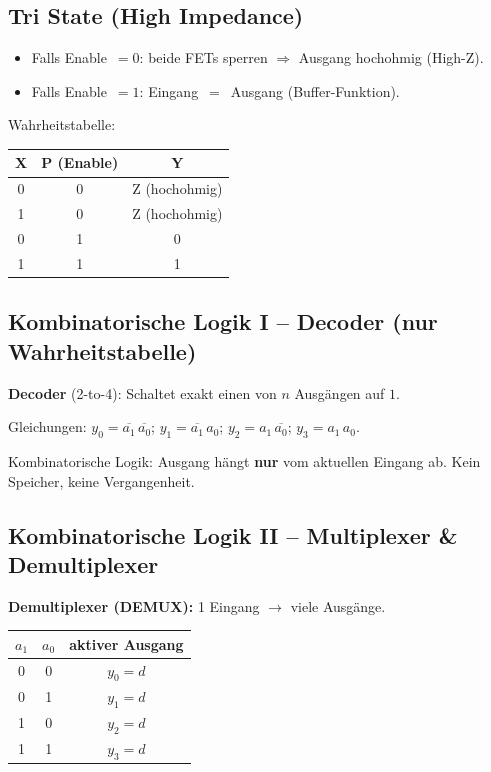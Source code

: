 \documentclass[11pt,a4paper]{article}
\begin{document}
\subsection{Tri State (High Impedance)}
\begin{itemize}
    \item Falls Enable~$= 0$: beide FETs sperren $\Rightarrow$ Ausgang hochohmig (High-Z).
    \item Falls Enable~$= 1$: Eingang~$=$~Ausgang (Buffer-Funktion).
\end{itemize}
Wahrheitstabelle:
\begin{center}
\begin{tabular}{cc|c}
    \toprule
    X & P (Enable) & Y \\ \midrule
    0 & 0 & Z (hochohmig) \\
    1 & 0 & Z (hochohmig) \\
    0 & 1 & 0 \\
    1 & 1 & 1 \\ \bottomrule
\end{tabular}
\end{center}

\subsection{Kombinatorische Logik I -- Decoder (nur Wahrheitstabelle)}
\textbf{Decoder} (2-to-4): Schaltet exakt einen von $n$ Ausgängen auf $1$.

Gleichungen: $y_0 = \overline{a_1}\,\overline{a_0}$; $y_1 = \overline{a_1}\,a_0$; $y_2 = a_1\,\overline{a_0}$; $y_3 = a_1\,a_0$.

Kombinatorische Logik: Ausgang hängt \textbf{nur} vom aktuellen Eingang ab. Kein Speicher, keine Vergangenheit.

\subsection{Kombinatorische Logik II -- Multiplexer \& Demultiplexer}
\textbf{Demultiplexer (DEMUX):} 1 Eingang $\to$ viele Ausgänge.

\begin{center}
\begin{tabular}{cc|c}
    \toprule
    $a_1$ & $a_0$ & aktiver Ausgang \\ \midrule
    0 & 0 & $y_0 = d$ \\
    0 & 1 & $y_1 = d$ \\
    1 & 0 & $y_2 = d$ \\
    1 & 1 & $y_3 = d$ \\ \bottomrule
\end{tabular}
\end{center}
\end{document}

